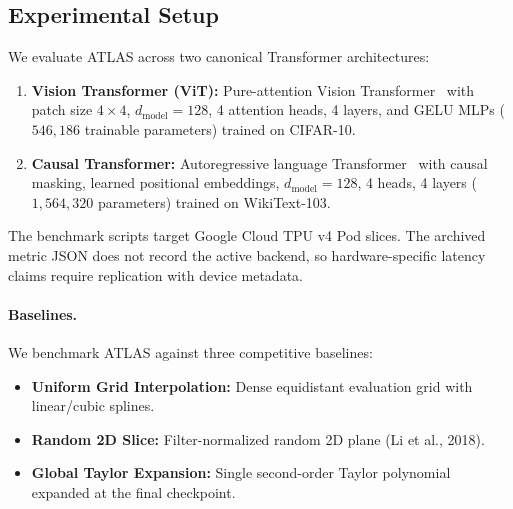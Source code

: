 \documentclass[11pt,a4paper]{article}
\theoremstyle{definition}
\theoremstyle{remark}
\begin{document}
\subsection{Experimental Setup}
We evaluate ATLAS across two canonical Transformer architectures:
\begin{enumerate}
    \item \textbf{Vision Transformer (ViT):} Pure-attention Vision Transformer~\cite{dosovitskiy2020image} with patch size $4 \times 4$, $d_{\text{model}} = 128$, 4 attention heads, 4 layers, and GELU MLPs ($546,186$ trainable parameters) trained on CIFAR-10.
    \item \textbf{Causal Transformer:} Autoregressive language Transformer~\cite{vaswani2017attention} with causal masking, learned positional embeddings, $d_{\text{model}} = 128$, 4 heads, 4 layers ($1,564,320$ parameters) trained on WikiText-103.
\end{enumerate}
The benchmark scripts target Google Cloud TPU v4 Pod slices. The archived metric JSON does not record the active backend, so hardware-specific latency claims require replication with device metadata.

\paragraph{Baselines.}
We benchmark ATLAS against three competitive baselines:
\begin{itemize}
    \item \textbf{Uniform Grid Interpolation:} Dense equidistant evaluation grid with linear/cubic splines.
    \item \textbf{Random 2D Slice:} Filter-normalized random 2D plane (Li et al., 2018).
    \item \textbf{Global Taylor Expansion:} Single second-order Taylor polynomial expanded at the final checkpoint.
\end{itemize}
\end{document}
